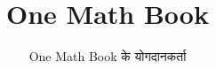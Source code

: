 \documentclass[11pt,a4paper,twoside,openany]{book}
\title{One Math Book}
\author{One Math Book के योगदानकर्ता}
\date{\bookdate}
\begin{document}
\frontmatter



\tableofcontents

\mainmatter





\appendix
\part{\omsolutionspart}




\backmatter
\printindex
\end{document}
